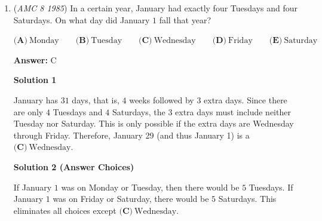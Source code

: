 \begin{enumerate}
Let $w$, $l$, and $p$ be the original width, length, and perimeter of the rectangle, respectively. Then $p = 2(w+l)$. 

 The width and length are increased to $1.1w$ and $1.1l$, respectively. Therefore, the new perimeter is $2(1.1w+1.1l)=2\cdot1.1(w+l) = 1.1 \cdot 2(w+l) = 1.1p$, or $\boxed{\textbf{(B)}\ 10\%}$ more than the original perimeter.

 



\textbf{Solution 2}

Since each side is scaled by a factor of $1.1$, the new rectangle is similar to the original, and therefore its perimeter is also scaled by a factor of $1.1$, that is, a $\boxed{\textbf{(B)}\ 10\%}$ increase.

 



\textbf{Solution 3}

Suppose the original rectangle is a square of side length $10$, so its perimeter is $4 \cdot 10 = 40$.  After scaling, its sides will have length $1.1 \cdot 10 = 11$, so its perimeter will be $11 \cdot 4 = 44$.  Therefore, the new perimeter is $\frac{44}{40} = 1.1$ times the original perimeter, a $\boxed{\textbf{(B)}\ 10\%}$ increase.

 


	\item (\textit{AMC 8 1985}) In a certain year, January had exactly four Tuesdays and four Saturdays.  On what day did January $1$ fall that year?


 $\textbf{(A)}\ \text{Monday} \qquad \textbf{(B)}\ \text{Tuesday} \qquad \textbf{(C)}\ \text{Wednesday} \qquad \textbf{(D)}\ \text{Friday} \qquad \textbf{(E)}\ \text{Saturday}$

 \textbf{Answer: }C



\textbf{Solution 1}

January has $31$ days, that is, $4$ weeks followed by $3$ extra days.  Since there are only $4$ Tuesdays and $4$ Saturdays, the $3$ extra days must include neither Tuesday nor Saturday.  This is only possible if the extra days are Wednesday through Friday.  Therefore, January 29 (and thus January 1) is a $\boxed{\textbf{(C)}\ \text{Wednesday}}$.

 



\textbf{Solution 2 (Answer Choices)}

If January $1$ was on Monday or Tuesday, then there would be $5$ Tuesdays.  If January $1$ was on Friday or Saturday, there would be $5$ Saturdays.  This eliminates all choices except $\boxed{\textbf{(C)}\ \text{Wednesday}}$.


\end{enumerate}
